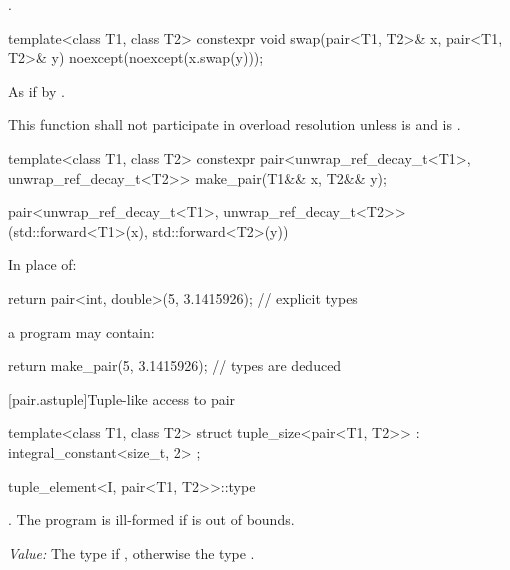 \begin{itemdescr}
\pnum
\returns {}.
\end{itemdescr}


%
\begin{itemdecl}
template<class T1, class T2>
  constexpr void swap(pair<T1, T2>& x, pair<T1, T2>& y) noexcept(noexcept(x.swap(y)));
\end{itemdecl}

\begin{itemdescr}
\pnum
\effects As if by .

\pnum
\remarks
This function shall not participate in overload resolution unless
 is  and
 is .
\end{itemdescr}

%
\begin{itemdecl}
template<class T1, class T2>
  constexpr pair<unwrap_ref_decay_t<T1>, unwrap_ref_decay_t<T2>> make_pair(T1&& x, T2&& y);
\end{itemdecl}

\begin{itemdescr}
\pnum
\returns
\begin{codeblock}
pair<unwrap_ref_decay_t<T1>,
     unwrap_ref_decay_t<T2>>(std::forward<T1>(x), std::forward<T2>(y))
\end{codeblock}
\end{itemdescr}

\pnum
\begin{example}
In place of:
\begin{codeblock}
  return pair<int, double>(5, 3.1415926);   // explicit types
\end{codeblock}
a \Cpp{} program may contain:
\begin{codeblock}
  return make_pair(5, 3.1415926);           // types are deduced
\end{codeblock}
\end{example}

[pair.astuple]{Tuple-like access to pair}

%
\begin{itemdecl}
template<class T1, class T2>
  struct tuple_size<pair<T1, T2>> : integral_constant<size_t, 2> { };
\end{itemdecl}

%
\begin{itemdecl}
tuple_element<I, pair<T1, T2>>::type
\end{itemdecl}
\begin{itemdescr}
\pnum
\requires {}. The program is ill-formed if  is out of bounds.

\pnum
\textit{Value:} The type  if , otherwise the type .
\end{itemdescr}


